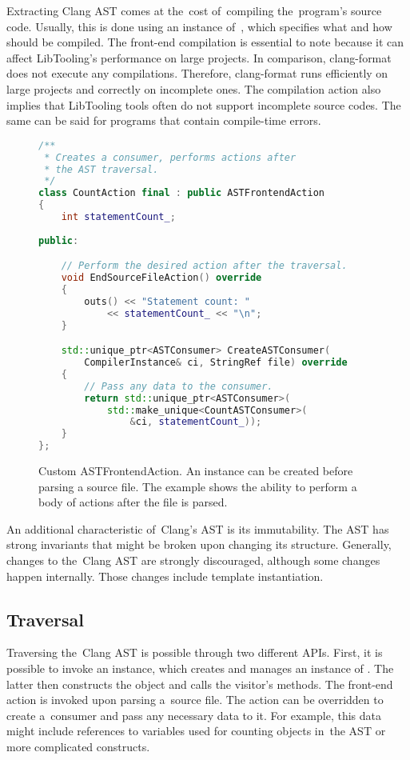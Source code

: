 Extracting Clang AST comes at the~cost of~compiling the~program's
source code. 
Usually, this is done using an instance of~, 
which specifies what and how should be compiled. 
The front-end compilation is essential to note because it can affect 
LibTooling's performance on large projects. 
In comparison, clang-format does not execute any compilations. 
Therefore, clang-format runs efficiently on large projects 
and correctly on incomplete ones. 
The compilation action also implies that LibTooling tools often 
do not support incomplete source codes. 
The same can be said for programs that contain compile-time errors.

\begin{figure}[h]\centering
\begin{lstlisting}[language=C++]
/**
 * Creates a consumer, performs actions after 
 * the AST traversal.
 */
class CountAction final : public ASTFrontendAction
{
	int statementCount_;
	
public:

	// Perform the desired action after the traversal.
	void EndSourceFileAction() override
	{
		outs() << "Statement count: " 
			<< statementCount_ << "\n";
	}

	std::unique_ptr<ASTConsumer> CreateASTConsumer(
		CompilerInstance& ci, StringRef file) override
	{
		// Pass any data to the consumer.
		return std::unique_ptr<ASTConsumer>(
			std::make_unique<CountASTConsumer>(
				&ci, statementCount_));
	}
};
\end{lstlisting}
\caption{Custom ASTFrontendAction. An instance can be created before
parsing a source file. The example shows the ability to perform
a body of actions after the file is parsed.}
\label{lst:astfrontendaction}
\end{figure}

An additional characteristic of~Clang's AST is its immutability. 
The AST has strong invariants that might be broken upon changing 
its structure. 
Generally, changes to the~Clang AST are strongly discouraged, 
although some changes happen internally. 
Those changes include template instantiation.

\subsection{Traversal}

Traversing the~Clang AST is possible through two different APIs. 
First, it is possible to invoke an  instance, 
which creates and manages an instance of . 
The latter then constructs the  object and 
calls the visitor's methods. 
The front-end action is invoked upon parsing a~source file. 
The action can be overridden to create a~consumer and pass any necessary 
data to it. 
For example, this data might include references to variables used for 
counting objects in~the AST or more complicated constructs. 

